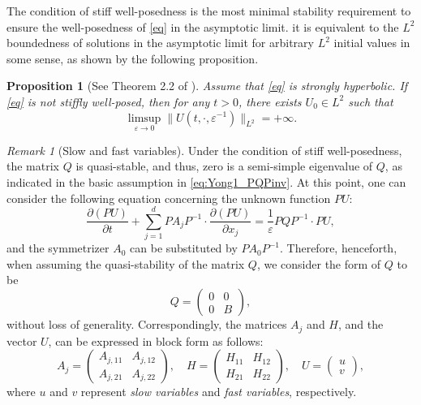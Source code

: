 \documentclass{article}
\theoremstyle{plain}%
\newtheorem{proposition}{Proposition}%
\theoremstyle{definition}%
\theoremstyle{remark}%
\newtheorem{remark}{Remark}%
\newcommand{\+}[1]{{\bm{#1}}}
\newcommand{\eps}{\varepsilon}
\newcommand{\norm}[1]{\|{#1}\|}
\newcommand{\pd}[2]{\dfrac{\partial{#1}}{\partial{#2}}}
\begin{document}
The condition of stiff well-posedness is the most minimal  
stability requirement to ensure the well-posedness of \cref{eq} in 
the asymptotic limit. it is equivalent to 
the $L^2$ boundedness of solutions in the asymptotic limit for 
arbitrary $L^2$ initial values in some sense, as shown by the 
following proposition.

\begin{proposition}[See Theorem 2.2 of \cite{Yong_basic_2002}]
  \label{prop:not_SWP}
  Assume that \cref{eq} is strongly hyperbolic. If 
  \cref{eq} is not stiffly well-posed, then for any $t > 0$, there 
  exists $U_0 \in L^2$ such that 
  \begin{displaymath}
    \mathop{\lim \sup}_{\eps \to 0} 
    \norm{U(t, \cdot, \eps^{-1})}_{L^2} = + \infty.
  \end{displaymath}
\end{proposition}

\begin{remark}[Slow and fast variables]
  Under the condition of stiff well-posedness, the matrix $Q$ is 
  quasi-stable, and thus, zero is a semi-simple eigenvalue of $Q$, 
  as indicated in the basic assumption in \cref{eq:Yong1_PQPinv}.
  At this point, one can consider the following equation concerning 
  the unknown function $P U$:
  \begin{displaymath}
    \pd{(P U)}{t} + \sum_{j = 1}^d P A_j P^{-1} \cdot \pd{(P U)}{x_j} 
    = \frac{1}{\eps} P Q P^{-1} \cdot P U,
  \end{displaymath}
  and the symmetrizer $A_0$ can be substituted by $P A_0 P^{-1}$.
  Therefore, henceforth, when assuming the quasi-stability of 
  the matrix $Q$, we consider the form of $Q$ to be 
  \begin{displaymath}
    Q = \begin{pmatrix} 0 & 0 \\ 0 & B \end{pmatrix},
  \end{displaymath}
  without loss of generality. 
  Correspondingly, the matrices $A_j$ and $H$, and the vector $U$, 
  can be expressed in block form as follows:
  \begin{displaymath}
    A_j = \begin{pmatrix}
      A_{j,11} & A_{j,12} \\ A_{j,21} & A_{j,22}
    \end{pmatrix}, \quad 
    H = \begin{pmatrix}
      H_{11} & H_{12} \\ H_{21} & H_{22}
    \end{pmatrix}, \quad 
    U = \begin{pmatrix}
      u \\ v
    \end{pmatrix},
  \end{displaymath}
  where $u$ and $v$ represent \textit{slow variables} and 
  \textit{fast variables}, respectively.
\end{remark}
\end{document}
